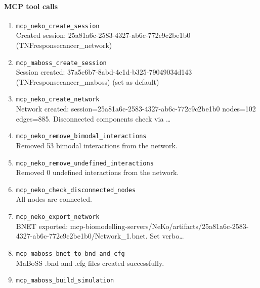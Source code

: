 \paragraph{MCP tool calls}
\begingroup
\small
\setlength{\itemsep}{5pt}
\setlength{\parskip}{0pt}
\begin{enumerate}
\item[1.] \texttt{mcp\_\allowbreak{}neko\_\allowbreak{}create\_\allowbreak{}session}
\hfill\\
\RaggedRight Created session: 25a81a6c-2583-4327-ab6c-772c9c2be1b0 (TNFresponsecancer\_network)
\item[2.] \texttt{mcp\_\allowbreak{}maboss\_\allowbreak{}create\_\allowbreak{}session}
\hfill\\
\RaggedRight Session created: 37a5e6b7-8abd-4c1d-b325-79049034d143 (TNFresponsecancer\_maboss) (set as default)
\item[3.] \texttt{mcp\_\allowbreak{}neko\_\allowbreak{}create\_\allowbreak{}network}
\hfill\\
\RaggedRight Network created: session=25a81a6c-2583-4327-ab6c-772c9c2be1b0 nodes=102 edges=885. Disconnected components check via \ldots{}
\item[4.] \texttt{mcp\_\allowbreak{}neko\_\allowbreak{}remove\_\allowbreak{}bimodal\_\allowbreak{}interactions}
\hfill\\
\RaggedRight Removed 53 bimodal interactions from the network.
\item[5.] \texttt{mcp\_\allowbreak{}neko\_\allowbreak{}remove\_\allowbreak{}undefined\_\allowbreak{}interactions}
\hfill\\
\RaggedRight Removed 0 undefined interactions from the network.
\item[6.] \texttt{mcp\_\allowbreak{}neko\_\allowbreak{}check\_\allowbreak{}disconnected\_\allowbreak{}nodes}
\hfill\\
\RaggedRight All nodes are connected.
\item[7.] \texttt{mcp\_\allowbreak{}neko\_\allowbreak{}export\_\allowbreak{}network}
\hfill\\
\RaggedRight BNET exported: mcp-biomodelling-servers/NeKo/artifacts/25a81a6c-2583-4327-ab6c-772c9c2be1b0/Network\_1.bnet. Set verbo\ldots{}
\item[8.] \texttt{mcp\_\allowbreak{}maboss\_\allowbreak{}bnet\_\allowbreak{}to\_\allowbreak{}bnd\_\allowbreak{}and\_\allowbreak{}cfg}
\hfill\\
\RaggedRight MaBoSS .bnd and .cfg files created successfully.
\item[9.] \texttt{mcp\_\allowbreak{}maboss\_\allowbreak{}build\_\allowbreak{}simulation}

\end{enumerate}
